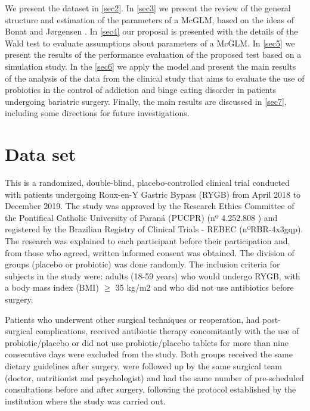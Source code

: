 \documentclass[AMA,STIX1COL]{WileyNJD-v2}
\begin{document}
We present the dataset in \autoref{sec2}. In \autoref{sec3} we present the review of the general structure and estimation of the parameters of a McGLM, based on the ideas of Bonat and Jørgensen \cite{Bonat16}. In \autoref{sec4} our proposal is presented with the details of the Wald test to evaluate assumptions about parameters of a McGLM. In \autoref{sec5} we present the results of the performance evaluation of the proposed test based on a simulation study. In the \autoref{sec6} we apply the model and present the main results of the analysis of the data from the clinical study that aims to evaluate the use of probiotics in the control of addiction and binge eating disorder in patients undergoing bariatric surgery. Finally, the main results are discussed in \autoref{sec7}, including some directions for future investigations.


\section{Data set}\label{sec2}


This is a randomized, double-blind, placebo-controlled clinical trial conducted with patients undergoing Roux-en-Y Gastric Bypass (RYGB) from April 2018 to December 2019. The study was approved by the Research Ethics Committee of the Pontifical Catholic University of Paraná (PUCPR) (nº 4.252.808 ) and registered by the Brazilian Registry of Clinical Trials - REBEC (nºRBR-4x3gqp). The research was explained to each participant before their participation and, from those who agreed, written informed consent was obtained. The division of groups (placebo or probiotic) was done randomly. The inclusion criteria for subjects in the study were: adults (18-59 years) who would undergo RYGB, with a body mass index (BMI) $\geq$ 35 kg/m2 and who did not use antibiotics before surgery. 

Patients who underwent other surgical techniques or reoperation, had post-surgical complications, received antibiotic therapy concomitantly with the use of probiotic/placebo or did not use probiotic/placebo tablets for more than nine consecutive days were excluded from the study. Both groups received the same dietary guidelines after surgery, were followed up by the same surgical team (doctor, nutritionist and psychologist) and had the same number of pre-scheduled consultations before and after surgery, following the protocol established by the institution where the study was carried out.
\end{document}
